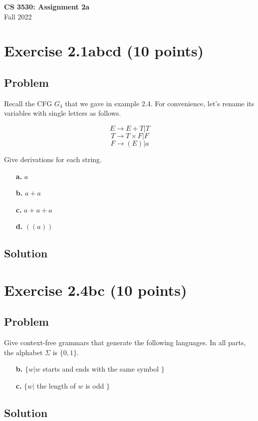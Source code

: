 \documentclass{article}
\begin{document}
\begin{empfile}

\begin{center}
\textbf{\Large CS 3530: Assignment 2a} \\[2mm]
Fall 2022
\end{center}

\raggedright



\section*{Exercise 2.1abcd (10 points)}

\subsection*{Problem}

Recall the CFG $G_4$ that we gave in example 2.4. For convenience, let's rename its variables with single letters as follows.

\[ E \rightarrow E + T|T \]
\[ T \rightarrow T \times F | F \]
\[ F \rightarrow (E) | a \]

Give derivations for each string.


\begin{enumerate}
\item[\textbf{a.}] $a$
\item[\textbf{b.}] $a+a$
\item[\textbf{c.}] $a+a+a$
\item[\textbf{d.}] $((a))$
\end{enumerate}

\subsection*{Solution}



\section*{Exercise 2.4bc (10 points)}

\subsection*{Problem}

Give context-free grammars that generate the following languages.  In all parts, the alphabet $\Sigma$ is $\{0,1\}$.

\begin{enumerate}
\item[\textbf{b.}] $\{ w | w$ starts and ends with the same symbol $\}$
\item[\textbf{c.}] $\{ w |$ the length of $w$ is odd $\}$
\end{enumerate}

\subsection*{Solution}


\end{empfile}
\immediate{}
\end{document}
